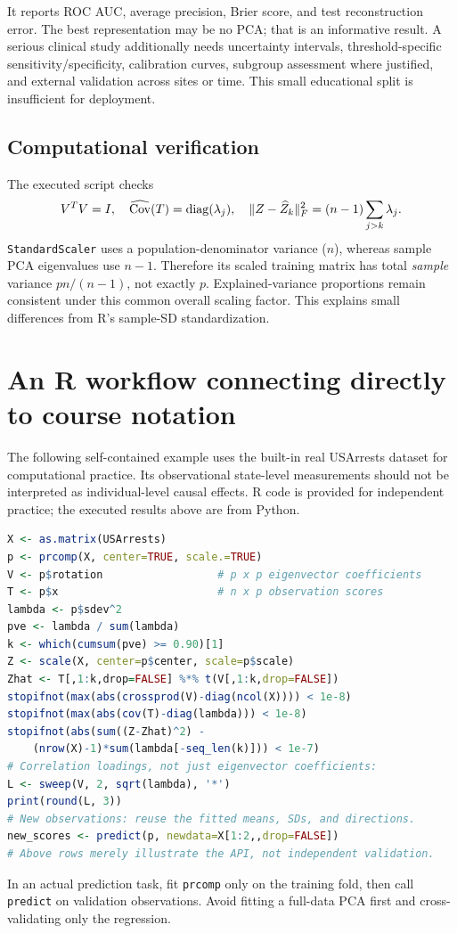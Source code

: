 \documentclass[11pt]{article}
\begin{document}
It reports ROC AUC, average precision, Brier score, and test reconstruction error. The best representation may be no PCA; that is an informative result. A serious clinical study additionally needs uncertainty intervals, threshold-specific sensitivity/specificity, calibration curves, subgroup assessment where justified, and external validation across sites or time. This small educational split is insufficient for deployment.

\subsection{Computational verification}
The executed script checks
\[
V^TV=I,\quad \widehat{\operatorname{Cov}}(T)=\operatorname{diag}(\lambda_j),\quad
\|Z-\widehat Z_k\|_F^2=(n-1)\sum_{j>k}\lambda_j.
\]
\texttt{StandardScaler} uses a population-denominator variance ($n$), whereas sample PCA eigenvalues use $n-1$. Therefore its scaled training matrix has total \emph{sample} variance $pn/(n-1)$, not exactly $p$. Explained-variance proportions remain consistent under this common overall scaling factor. This explains small differences from R's sample-SD standardization.

\section{An R workflow connecting directly to course notation}
The following self-contained example uses the built-in real USArrests dataset for computational practice. Its observational state-level measurements should not be interpreted as individual-level causal effects. R code is provided for independent practice; the executed results above are from Python.
\begin{lstlisting}[language=R]
X <- as.matrix(USArrests)
p <- prcomp(X, center=TRUE, scale.=TRUE)
V <- p$rotation                  # p x p eigenvector coefficients
T <- p$x                         # n x p observation scores
lambda <- p$sdev^2
pve <- lambda / sum(lambda)
k <- which(cumsum(pve) >= 0.90)[1]
Z <- scale(X, center=p$center, scale=p$scale)
Zhat <- T[,1:k,drop=FALSE] %*% t(V[,1:k,drop=FALSE])
stopifnot(max(abs(crossprod(V)-diag(ncol(X)))) < 1e-8)
stopifnot(max(abs(cov(T)-diag(lambda))) < 1e-8)
stopifnot(abs(sum((Z-Zhat)^2) -
    (nrow(X)-1)*sum(lambda[-seq_len(k)])) < 1e-7)
# Correlation loadings, not just eigenvector coefficients:
L <- sweep(V, 2, sqrt(lambda), '*')
print(round(L, 3))
# New observations: reuse the fitted means, SDs, and directions.
new_scores <- predict(p, newdata=X[1:2,,drop=FALSE])
# Above rows merely illustrate the API, not independent validation.
\end{lstlisting}
In an actual prediction task, fit \texttt{prcomp} only on the training fold, then call \texttt{predict} on validation observations. Avoid fitting a full-data PCA first and cross-validating only the regression.
\end{document}
